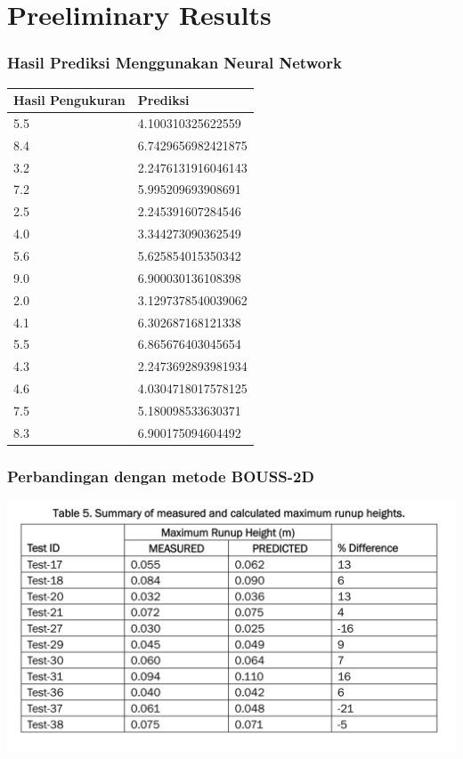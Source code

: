 \chapter{Preeliminary Results}

\subsection{Hasil Prediksi Menggunakan Neural Network}

\begin{center}
\begin{tabular}{|l|l|}
\hline
Hasil Pengukuran & Prediksi \\ \hline
5.5 & 4.100310325622559 \\ \hline
8.4 & 6.7429656982421875 \\ \hline
3.2 & 2.2476131916046143 \\ \hline
7.2 & 5.995209693908691 \\ \hline
2.5 & 2.245391607284546 \\ \hline
4.0 & 3.344273090362549 \\ \hline
5.6 & 5.625854015350342 \\ \hline
9.0 & 6.900030136108398 \\ \hline
2.0 & 3.1297378540039062 \\ \hline
4.1 & 6.302687168121338 \\ \hline
5.5 & 6.865676403045654 \\ \hline
4.3 & 2.2473692893981934 \\ \hline
4.6 & 4.0304718017578125 \\ \hline
7.5 & 5.180098533630371 \\ \hline
8.3 & 6.900175094604492 \\ \hline
\end{tabular}
\end{center}

\subsection{Perbandingan dengan metode BOUSS-2D}
\begin{center}
\includegraphics{table}
\end{center}